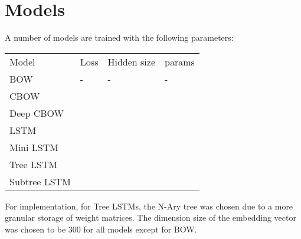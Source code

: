\section{Models}
\label{sec: models}
A number of models are trained with the following parameters:

\begin{table}[]
\begin{tabular}{llll}
Model  & Loss & Hidden size & params \\
BOW          & -             & -           & -                \\
CBOW         &               &             &                  \\
Deep CBOW    &               &             &                  \\
LSTM         &               &             &                  \\
Mini LSTM    &               &             &                  \\
Tree LSTM    &               &             &                  \\
Subtree LSTM &               &             &                 
\end{tabular}
\end{table}

For implementation, for Tree LSTMs, the N-Ary tree was chosen due to a more
granular storage of weight matrices. The dimension size of the embedding vector
was chosen to be 300 for all models except for BOW.